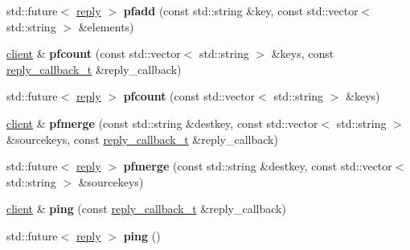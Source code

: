 \begin{DoxyCompactItemize}
\mbox{\label{classcpp__redis_1_1client_ac6534e0aaf0ef3c87e312b12fd1a5a97}} 
std\+::future$<$ \hyperlink{classcpp__redis_1_1reply}{reply} $>$ {\bfseries pfadd} (const std\+::string \&key, const std\+::vector$<$ std\+::string $>$ \&elements)
\item 
\mbox{\label{classcpp__redis_1_1client_acf88e97aac689b64af0e73843811d837}} 
\hyperlink{classcpp__redis_1_1client}{client} \& {\bfseries pfcount} (const std\+::vector$<$ std\+::string $>$ \&keys, const \hyperlink{classcpp__redis_1_1client_a061a1140d36d2eaeda82b09a0bb3f9f2}{reply\+\_\+callback\+\_\+t} \&reply\+\_\+callback)
\item 
\mbox{\label{classcpp__redis_1_1client_ad357677011d10800e2595db129bfbfff}} 
std\+::future$<$ \hyperlink{classcpp__redis_1_1reply}{reply} $>$ {\bfseries pfcount} (const std\+::vector$<$ std\+::string $>$ \&keys)
\item 
\mbox{\label{classcpp__redis_1_1client_aad4f7f35b13e4d236d178ed47a499353}} 
\hyperlink{classcpp__redis_1_1client}{client} \& {\bfseries pfmerge} (const std\+::string \&destkey, const std\+::vector$<$ std\+::string $>$ \&sourcekeys, const \hyperlink{classcpp__redis_1_1client_a061a1140d36d2eaeda82b09a0bb3f9f2}{reply\+\_\+callback\+\_\+t} \&reply\+\_\+callback)
\item 
\mbox{\label{classcpp__redis_1_1client_acfeb0b2a7adb65d9cb940d96b9d24478}} 
std\+::future$<$ \hyperlink{classcpp__redis_1_1reply}{reply} $>$ {\bfseries pfmerge} (const std\+::string \&destkey, const std\+::vector$<$ std\+::string $>$ \&sourcekeys)
\item 
\mbox{\label{classcpp__redis_1_1client_a19f0127614ca1369dcf739427079f7ec}} 
\hyperlink{classcpp__redis_1_1client}{client} \& {\bfseries ping} (const \hyperlink{classcpp__redis_1_1client_a061a1140d36d2eaeda82b09a0bb3f9f2}{reply\+\_\+callback\+\_\+t} \&reply\+\_\+callback)
\item 
\mbox{\label{classcpp__redis_1_1client_a5273cf454284e04f4c43e1b391170009}} 
std\+::future$<$ \hyperlink{classcpp__redis_1_1reply}{reply} $>$ {\bfseries ping} ()

\end{DoxyCompactItemize}
